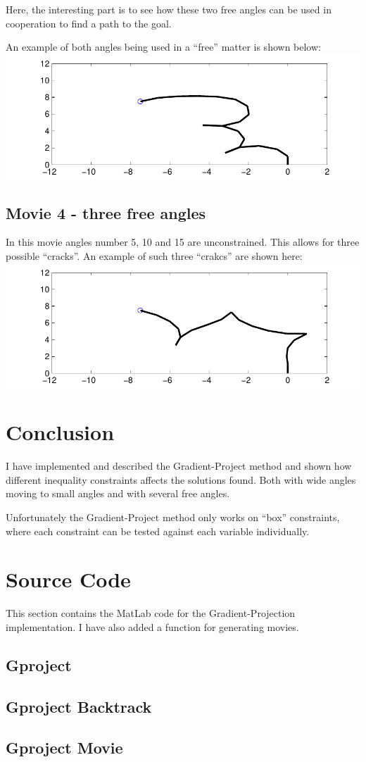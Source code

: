 \documentclass[10pt,oneside,a4paper,final,english]{memoir}
\begin{document}
Here, the interesting part is to see how these two free angles can be
used in cooperation to find a path to the goal.

An example of both angles being used in a ``free'' matter is shown
below:\\
\includegraphics[width=\textwidth]{images/movie3.pdf}

\subsection{Movie 4 - three free angles}
In this movie angles number 5, 10 and 15 are unconstrained.  This
allows for three possible ``cracks''. An example of such three
``crakcs'' are shown here:\\

\includegraphics[width=\textwidth]{images/movie4.pdf}

\section{Conclusion}
I have implemented and described the Gradient-Project method and shown
how different inequality constraints affects the solutions found. Both
with wide angles moving to small angles and with several free angles.

Unfortunately the Gradient-Project method only works on ``box''
constraints, where each constraint can be tested against each variable
individually.


\section{Source Code}
This section contains the MatLab code for the Gradient-Projection
implementation. I have also added a function for generating movies.

\subsection{Gproject}


\subsection{Gproject Backtrack}


\subsection{Gproject Movie}

\end{document}
